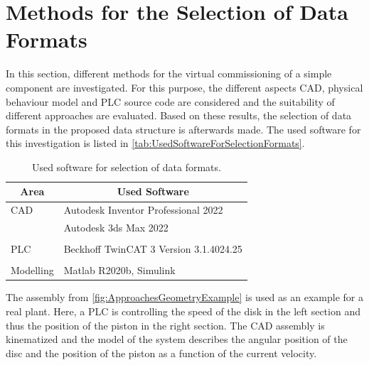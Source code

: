     
    
\section{Methods for the Selection of Data Formats}
    In this section, different methods for the virtual commissioning of a simple component are investigated. For this purpose, the different aspects CAD, physical behaviour model and PLC source code are considered and the suitability of different approaches are evaluated. Based on these results, the selection of data formats in the proposed data structure is afterwards made. The used software for this investigation is listed in \autoref{tab:UsedSoftwareForSelectionFormats}.\\
      \begin{table}[htp]
    	\footnotesize
    	\centering
    	\caption{Used software for selection of data formats.}
    	\begin{tabular}{ll}
    		\toprule
    		\multicolumn{1}{c}{Area} & \multicolumn{1}{c}{Used Software}  \\
    		\midrule
    		CAD & Autodesk Inventor Professional 2022\\
    		    & Autodesk 3ds Max 2022 \\
    		    & \\
		    PLC & Beckhoff TwinCAT 3 Version 3.1.4024.25\\
		      & \\
	        Modelling  & Matlab R2020b, Simulink\\
    		\bottomrule
    	\end{tabular}	
    	\label{tab:UsedSoftwareForSelectionFormats}
    \end{table}
    
    The assembly from \autoref{fig:ApproachesGeometryExample} is used as an example for a real plant. Here, a PLC is controlling the speed of the disk in the left section and thus the position of the piston in the right section. The CAD assembly is kinematized and the model of the system describes the angular position of the disc and the position of the piston as a function of the current velocity.
  
    
